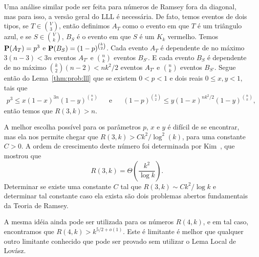 Uma análise similar pode ser feita para números de Ramsey fora da diagonal, mas para isso, a versão geral do LLL é necessária. De fato, temos eventos de dois tipos, se $T \in \binom{V}{3}$, então definimos $A_T$ como o evento em que $T$ é um triângulo azul, e se $S \in \binom{V}{k}$, $B_S$ é o evento em que $S$ é um $K_k$ vermelho.
Temos $\operatorname{\mathbf{P}}(A_T) = p^3$ e $\operatorname{\mathbf{P}}(B_S) = (1-p)^{\binom{k}{2}}$.
Cada evento $A_T$ é dependente de no máximo $3(n-3) < 3n$ eventos $A_{T'}$ e $\binom{n}{k}$ eventos $B_{S'}$. E cada evento $B_S$ é dependente de no máximo $\binom{k}{2}(n-2) < nk^2/2$ eventos $A_{T'}$ e $\binom{n}{k}$ eventos $B_{S'}$.
Segue então do Lema~\ref{thm:prob:lll} que se existem $0 < p < 1$ e dois reais $0 \leq x,y < 1$, tais que
\begin{align*} p^3 \leq x(1-x)^{3n}(1-y)^{\binom{n}{k}} && \text{e} &&
(1-p)^{\binom{k}{2}} \leq y(1-x)^{nk^2/2}(1-y)^{\binom{n}{k}},
\end{align*}
então temos que $R(3,k) > n$.

A melhor escolha possível para os parâmetros $p$, $x$ e $y$ é difícil de se encontrar, mas ela nos permite chegar que $R(3,k) > Ck^2/\log^2(k)$, para uma constante $C > 0$. A ordem de crescimento deste número foi determinada por Kim~\cite{kim1995ramsey}, que mostrou que
\[ R(3,k) = \Theta\left( \frac{k^2}{\log k}\right). \]
Determinar se existe uma constante $C$ tal que $R(3,k) \sim Ck^2 / \log k$ e determinar tal constante caso ela exista são dois problemas abertos fundamentais da Teoria de Ramsey.

A mesma idéia ainda pode ser utilizada para os números $R(4,k)$, e em tal caso, encontramos que $R(4,k) > k^{5/2 + o(1)}$. Este é limitante é melhor que qualquer outro limitante conhecido que pode ser provado sem utilizar o Lema Local de Lovász.


